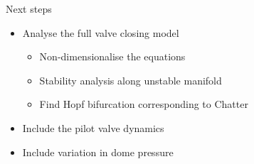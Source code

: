 \documentclass[svgnames,fragile]{beamer}
\begin{document}

\begin{frame}{Next steps}
\begin{itemize}
    \item<1-> Analyse the full valve closing model
    \begin{itemize}
        \item<2-> Non-dimensionalise the equations
        \item<3-> Stability analysis along unstable manifold
        \item<4-> Find Hopf bifurcation corresponding to Chatter
    \end{itemize}
    \item<5-> Include the pilot valve dynamics
    \item<6-> Include variation in dome pressure
\end{itemize}
\end{frame}
\end{document}
